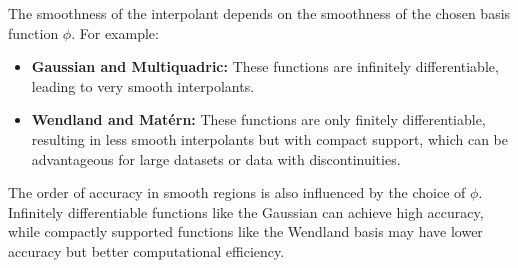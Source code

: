 \documentclass[preprint]{elsarticle}       %
\begin{document}

The smoothness of the interpolant depends on the smoothness of the chosen basis function $\phi$. For example:

\begin{itemize}
    \item \textbf{Gaussian and Multiquadric:} These functions are infinitely differentiable, leading to very smooth interpolants.
    \item \textbf{Wendland and Mat\'ern:} These functions are only finitely differentiable, resulting in less smooth interpolants but with compact support, which can be advantageous for large datasets or data with discontinuities.
\end{itemize}

The order of accuracy in smooth regions is also influenced by the choice of $\phi$. Infinitely differentiable functions like the Gaussian can achieve high accuracy, while compactly supported functions like the Wendland basis may have lower accuracy but better computational efficiency.
\end{document}
